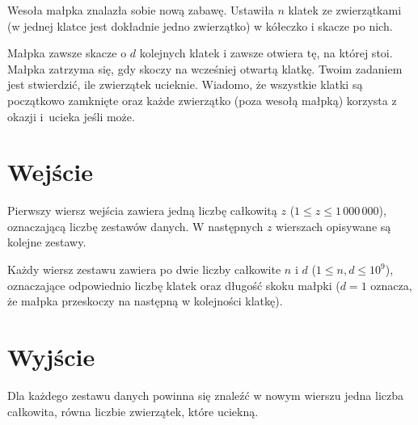 \documentclass{spiral-kurs}
\begin{document}
\makeheader
%
    Wesoła małpka znalazła sobie nową zabawę. Ustawiła $n$ klatek ze zwierzątkami
    (w jednej klatce jest dokładnie jedno zwierzątko) w kółeczko i skacze po nich.

    Małpka zawsze skacze o $d$ kolejnych klatek i zawsze otwiera tę, na której stoi.
    Małpka zatrzyma się, gdy skoczy na wcześniej otwartą klatkę.
    Twoim zadaniem jest stwierdzić, ile zwierzątek ucieknie.
    Wiadomo, że wszystkie klatki są początkowo zamknięte oraz każde zwierzątko
    (poza wesołą małpką) korzysta z okazji i~ucieka jeśli może.

  \section{Wejście}
    Pierwszy wiersz wejścia zawiera jedną liczbę całkowitą $z$ ($1 \leq z \leq 1\,000\,000$),
    oznaczającą liczbę zestawów danych.
    W następnych $z$ wierszach opisywane są kolejne zestawy.

    Każdy wiersz zestawu zawiera po dwie liczby całkowite $n$ i $d$ ($1 \leq n, d \leq 10^9$),
    oznaczające odpowiednio liczbę klatek oraz długość skoku małpki
    ($d = 1$ oznacza, że małpka przeskoczy na następną w kolejności klatkę).

  \section{Wyjście}
    Dla każdego zestawu danych powinna się znaleźć w nowym wierszu jedna liczba całkowita,
    równa liczbie zwierzątek, które uciekną.


  
\end{document}
